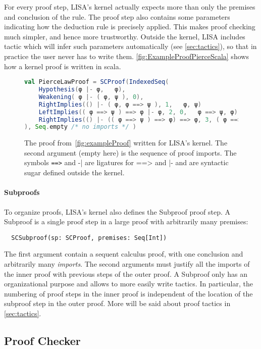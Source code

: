 For every proof step, LISA's kernel actually expects more than only the premises and conclusion of the rule. The proof step also contains some parameters indicating how the deduction rule is precisely applied. This makes proof checking much simpler, and hence more trustworthy. Outside the kernel, LISA includes tactic which will infer such parameters automatically (see \autoref{sec:tactics}), so that in practice the user never has to write them.
\autoref{fig:ExampleProofPierceScala} shows how a kernel proof is written in scala.

\begin{figure}[ht]
  \centering
  \begin{lstlisting}[language=scala, showspaces=false]
val PierceLawProof = SCProof(IndexedSeq(
    Hypothesis(φ |- φ,   φ),
    Weakening( φ |- ( φ, ψ ), 0),
    RightImplies(() |- ( φ, φ ==> ψ ), 1,   φ, ψ)
    LeftImplies(( φ ==> ψ ) ==> φ |- φ, 2, 0,   φ ==> ψ, φ),
    RightImplies(() |- (( φ ==> ψ ) ==> φ) ==> φ, 3, ( φ ==> ψ ) ==> φ, φ)
), Seq.empty /* no imports */ )
    \end{lstlisting}
  \caption{The proof from~\autoref{fig:exampleProof} written for LISA's kernel. The second argument (empty here) is the sequence of proof imports. The symbols \lstinline|==>| and \lstinline||-| are ligatures for ==> and |- and are syntactic sugar defined outside the kernel.}
  \label{fig:ExampleProofPierceScala}
\end{figure}

\paragraph*{Subproofs}
To organize proofs, LISA's kernel also defines the Subproof proof step. A Subproof is a single proof step in a large proof with arbitrarily many premises:
\begin{lstlisting}
  SCSubproof(sp: SCProof, premises: Seq[Int])
\end{lstlisting}
The first argument contain a sequent calculus proof, with one conclusion and arbitrarily many \textit{imports}. The second arguments must justify all the imports of the inner proof with previous steps of the outer proof.
A Subproof only has an organizational purpose and allows to more easily write tactics. In particular, the numbering of proof steps  in the inner proof is independent of the location of the subproof step in the  outer proof. More will be said about proof tactics in \autoref{sec:tactics}.

\subsection{Proof Checker}
\label{subsec:proofchecker}

